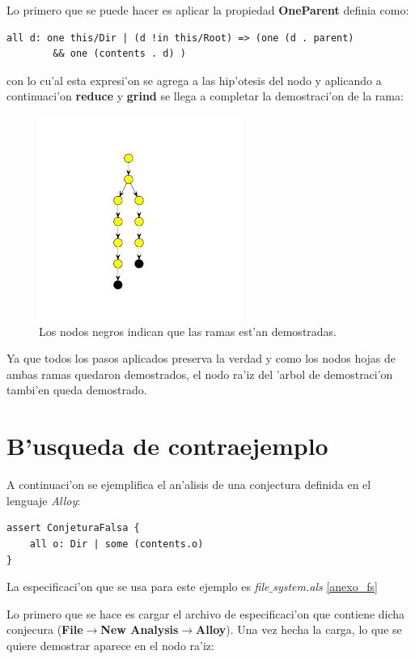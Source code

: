 Lo primero que se puede hacer es aplicar la propiedad \textbf{OneParent} definia como:

\begin{verbatim}
all d: one this/Dir | (d !in this/Root) => (one (d . parent)
		&& one (contents . d) )
\end{verbatim}

con lo cu'al esta expresi'on se agrega a las hip'otesis del nodo y aplicando a continuaci'on \textbf{reduce} y \textbf{grind} se llega a completar la demostraci'on de la rama:

\begin{figure}[H]
	\includegraphics[width=250px]{img/ejemplo/15.png}
	\centering
	\caption{Los nodos negros indican que las ramas est'an demostradas.}
\end{figure}

Ya que todos los pasos aplicados preserva la verdad y como los nodos hojas de ambas ramas quedaron demostrados, el nodo ra'iz del 'arbol de demostraci'on tambi'en queda demostrado.


\section{B'usqueda de contraejemplo}

A continuaci'on se ejemplifica el an'alisis de una conjectura definida en el lenguaje \textit{Alloy}:

\begin{verbatim}
assert ConjeturaFalsa {
    all o: Dir | some (contents.o)
}
\end{verbatim}

La especificaci'on que se usa para este ejemplo es \textit{file$\_$system.als} \ref{anexo_fs}

Lo primero que se hace es cargar el archivo de especificaci'on que contiene dicha conjecura (\textbf{File$\rightarrow$New Analysis$\rightarrow$Alloy}). Una vez hecha la carga, lo que se quiere demostrar aparece en el nodo ra'iz:

